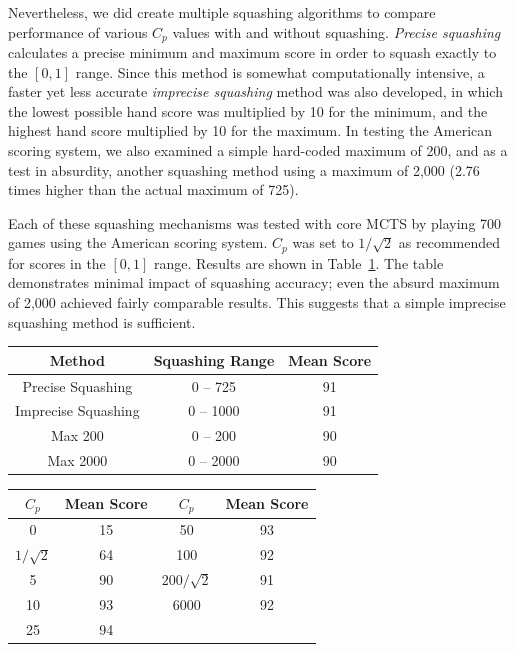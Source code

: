 \documentclass[letterpaper]{article}
\begin{document}
Nevertheless, we did create multiple squashing algorithms to compare performance of various $C_p$ values with and without squashing. {\it Precise squashing} calculates a precise minimum and maximum score in order to squash exactly to the $[0,1]$ range. Since this method is somewhat computationally intensive, a faster yet less accurate {\it imprecise squashing} method was also developed, in which the lowest possible hand score was multiplied by 10 for the minimum, and the highest hand score multiplied by 10 for the maximum. In testing the American scoring system, we also examined a simple hard-coded maximum of 200, and as a test in absurdity, another squashing method using a maximum of 2,000 (2.76 times higher than the actual maximum of 725).

Each of these squashing mechanisms was tested with core MCTS by playing 700 games using the American scoring system. $C_p$ was set to $1 / \sqrt{2}$ as recommended for scores in the $[0,1]$ range. Results are shown in Table~\ref{tbl:Squashing}. The table demonstrates minimal impact of squashing accuracy; even the absurd maximum of 2,000 achieved fairly comparable results. This suggests that a simple imprecise squashing method is sufficient.

\begin{table}
\label{tbl:Squashing}
\centering
\begin{tabular}{c c c}
\hline
Method & Squashing Range & Mean Score \\
\hline
Precise Squashing & 0 -- 725 & 91 \\
Imprecise Squashing & 0 -- 1000 & 91 \\
Max 200 & 0 -- 200 & 90 \\
Max 2000 & 0 -- 2000 & 90 \\
\hline
\end{tabular}
\end{table}

\begin{table}
\label{tbl:noSquashing}
\centering
\begin{tabular}{c c || c c}
\hline
{\bf $C_p$} & {\bf Mean Score} & {\bf $C_p$} & {\bf Mean Score} \\
\hline
0 & 15 &                                        50 & 93        \\
$1 /\!\sqrt{2}$ & 64 &                      100 & 92                       \\
5 & 90 &                                        $200 /\!\sqrt{2}$ & 91       \\
10 & 93 &                                      6000 & 92        \\
25 & 94 \\
\hline
\end{tabular}
\end{table}
\end{document}
